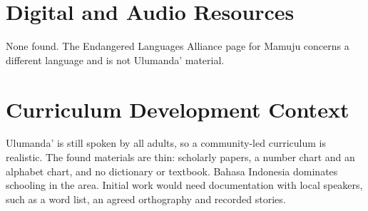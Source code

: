 \documentclass[12pt]{article}
\begin{document}
\section{Digital and Audio Resources}
None found. The Endangered Languages Alliance page for Mamuju concerns a different language and is not Ulumanda' material.

\section{Curriculum Development Context}
Ulumanda' is still spoken by all adults, so a community-led curriculum is realistic. The found materials are thin: scholarly papers, a number chart and an alphabet chart, and no dictionary or textbook. Bahasa Indonesia dominates schooling in the area. Initial work would need documentation with local speakers, such as a word list, an agreed orthography and recorded stories.
\end{document}
